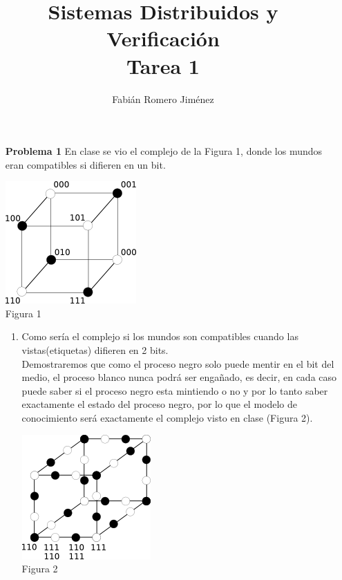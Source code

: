 \documentclass{article}
\title{Sistemas Distribuidos y Verificación \\ Tarea 1}
\author{Fabián Romero Jiménez}
\begin{document}
\maketitle

\begin{enumerate}

\item[\bf{Problema 1}] En clase se vio el complejo de la Figura 1, donde los mundos eran compatibles si difieren en un bit.\\

\begin{center}
  \includegraphics{cubo1.png}\\
  Figura 1
\end{center}


\begin{enumerate}

\item Como sería el complejo si los mundos son compatibles cuando las vistas(etiquetas) difieren en 2 bits.\\

Demostraremos que como el proceso negro solo puede mentir en el bit del medio, el proceso blanco nunca podrá ser engañado, es decir, en cada caso puede saber si el proceso negro esta mintiendo o no y por lo tanto saber exactamente el estado del proceso negro, por lo que el modelo de conocimiento será exactamente el complejo visto en clase (Figura 2).\\

\begin{center}
  \includegraphics{cubo2.png}\\
  Figura 2
\end{center}


\end{enumerate}
\end{enumerate}
\end{document}
